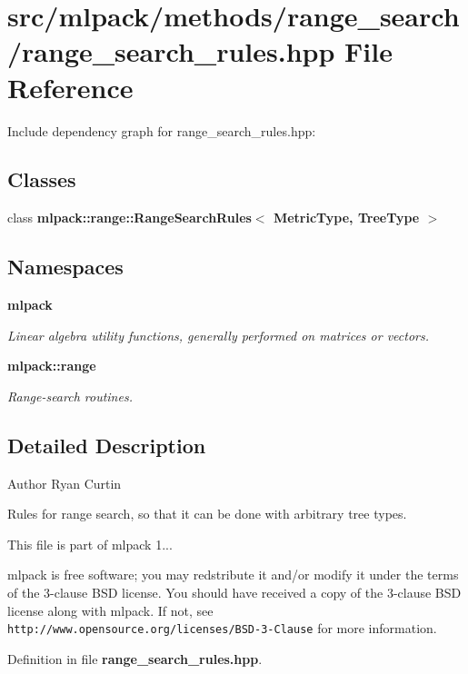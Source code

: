 \section{src/mlpack/methods/range\-\_\-search/range\-\_\-search\-\_\-rules.hpp File Reference}
\label{range__search__rules_8hpp}
Include dependency graph for range\-\_\-search\-\_\-rules.\-hpp\-:
\subsection*{Classes}
\begin{DoxyCompactItemize}
\item 
class {\bf mlpack\-::range\-::\-Range\-Search\-Rules$<$ Metric\-Type, Tree\-Type $>$}
\end{DoxyCompactItemize}
\subsection*{Namespaces}
\begin{DoxyCompactItemize}
\item 
{\bf mlpack}
\begin{DoxyCompactList}\small\item\em Linear algebra utility functions, generally performed on matrices or vectors. \end{DoxyCompactList}\item 
{\bf mlpack\-::range}
\begin{DoxyCompactList}\small\item\em Range-\/search routines. \end{DoxyCompactList}\end{DoxyCompactItemize}


\subsection{Detailed Description}
\begin{DoxyAuthor}{Author}
Ryan Curtin
\end{DoxyAuthor}
Rules for range search, so that it can be done with arbitrary tree types.

This file is part of mlpack 1...

mlpack is free software; you may redstribute it and/or modify it under the terms of the 3-\/clause B\-S\-D license. You should have received a copy of the 3-\/clause B\-S\-D license along with mlpack. If not, see {\tt http\-://www.\-opensource.\-org/licenses/\-B\-S\-D-\/3-\/\-Clause} for more information. 

Definition in file {\bf range\-\_\-search\-\_\-rules.\-hpp}.

